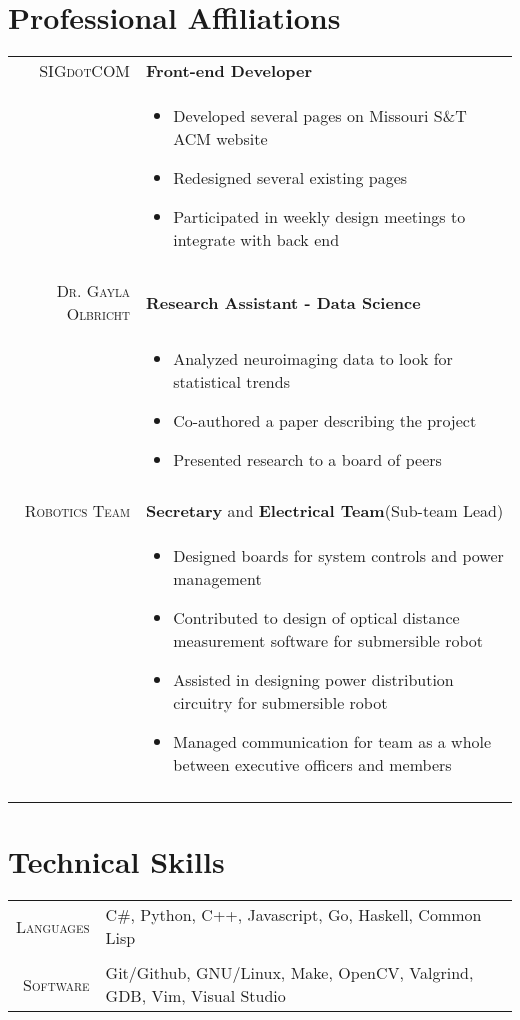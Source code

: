 \documentclass[a4paper,10pt]{article}
\newcommand{\br}{\\\multicolumn{2}{c}{}}
\begin{document}
\section{Professional Affiliations}
\begin{tabular}{r|p{15cm}}
    \textsc{SIGdotCOM} & \textbf{Front-end Developer} \\
    & \begin{itemize}
    \item Developed several pages on Missouri S\&T ACM website
    \item Redesigned several existing pages
    \item Participated in weekly design meetings to integrate with back end
    \end{itemize} \br\\

    \textsc{Dr. Gayla Olbricht} & \textbf{Research Assistant - Data Science} \\
     & \begin{itemize}
    \item Analyzed neuroimaging data to look for statistical trends
    \item Co-authored a paper describing the project
    \item Presented research to a board of peers
    \end{itemize} \br\\

    \textsc{Robotics Team} & \textbf{Secretary} and \textbf{Electrical Team}(Sub-team Lead) \\
     & \begin{itemize}
     \item Designed boards for system controls and power management
     \item Contributed to design of optical distance measurement software for submersible robot
     \item Assisted in designing power distribution circuitry for submersible robot
     \item Managed communication for team as a whole between executive officers and members
    \end{itemize} \br\\


\end{tabular}

\section{Technical Skills}
\begin{tabular}{r|p{15cm}}
    \textsc{\small Languages} &
    C\#,
    Python,
    C++,
    Javascript,
    Go,
    Haskell,
    Common Lisp\br\\

    \textsc{\small Software} &
    Git/Github,
    GNU/Linux,
    Make,
    OpenCV,
    Valgrind,
    GDB,
    Vim,
    Visual Studio
\end{tabular}
\end{document}
